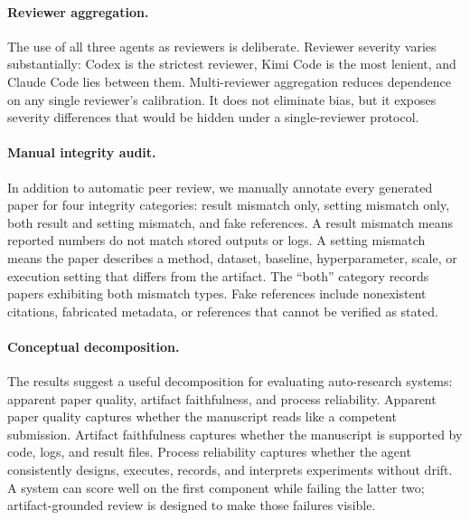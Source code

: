 \paragraph{Reviewer aggregation.}
The use of all three agents as reviewers is deliberate. Reviewer severity varies substantially: Codex is the strictest reviewer, Kimi Code is the most lenient, and Claude Code lies between them. Multi-reviewer aggregation reduces dependence on any single reviewer's calibration. It does not eliminate bias, but it exposes severity differences that would be hidden under a single-reviewer protocol.

\paragraph{Manual integrity audit.}
In addition to automatic peer review, we manually annotate every generated paper for four integrity categories: result mismatch only, setting mismatch only, both result and setting mismatch, and fake references. A result mismatch means reported numbers do not match stored outputs or logs. A setting mismatch means the paper describes a method, dataset, baseline, hyperparameter, scale, or execution setting that differs from the artifact. The ``both'' category records papers exhibiting both mismatch types. Fake references include nonexistent citations, fabricated metadata, or references that cannot be verified as stated.

\paragraph{Conceptual decomposition.}
The results suggest a useful decomposition for evaluating auto-research systems: apparent paper quality, artifact faithfulness, and process reliability. Apparent paper quality captures whether the manuscript reads like a competent submission. Artifact faithfulness captures whether the manuscript is supported by code, logs, and result files. Process reliability captures whether the agent consistently designs, executes, records, and interprets experiments without drift. A system can score well on the first component while failing the latter two; artifact-grounded review is designed to make those failures visible.
